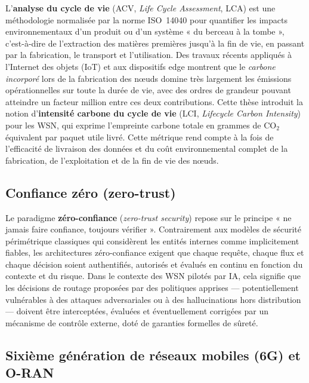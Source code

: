 L'\textbf{analyse du cycle de vie} (ACV, \emph{Life Cycle Assessment}, LCA) est une méthodologie normalisée par la norme ISO~14040 pour quantifier les impacts environnementaux d'un produit ou d'un système « du berceau à la tombe », c'est-à-dire de l'extraction des matières premières jusqu'à la fin de vie, en passant par la fabrication, le transport et l'utilisation\cite{iso14040}. Des travaux récents appliqués à l'Internet des objets (IoT) et aux dispositifs edge montrent que le \emph{carbone incorporé} lors de la fabrication des nœuds domine très largement les émissions opérationnelles sur toute la durée de vie, avec des ordres de grandeur pouvant atteindre un facteur million entre ces deux contributions\cite{pirson2021embodied,bashir2024sunk,mersy2025lca_data}. Cette thèse introduit la notion d'\textbf{intensité carbone du cycle de vie} (LCI, \emph{Lifecycle Carbon Intensity}) pour les WSN, qui exprime l'empreinte carbone totale en grammes de CO$_2$ équivalent par paquet utile livré. Cette métrique rend compte à la fois de l'efficacité de livraison des données et du coût environnemental complet de la fabrication, de l'exploitation et de la fin de vie des nœuds\cite{pirson2021embodied,aioti2024carbon}.

\subsection*{Confiance zéro (zero-trust)}

Le paradigme \textbf{zéro-confiance} (\emph{zero-trust security}) repose sur le principe « ne jamais faire confiance, toujours vérifier »\cite{rose2020nist}. Contrairement aux modèles de sécurité périmétrique classiques qui considèrent les entités internes comme implicitement fiables, les architectures zéro-confiance exigent que chaque requête, chaque flux et chaque décision soient authentifiés, autorisés et évalués en continu en fonction du contexte et du risque\cite{Kizza2013,ztaiot_acm2025}. Dans le contexte des WSN pilotés par IA, cela signifie que les décisions de routage proposées par des politiques apprises — potentiellement vulnérables à des attaques adversariales ou à des hallucinations hors distribution — doivent être interceptées, évaluées et éventuellement corrigées par un mécanisme de contrôle externe, doté de garanties formelles de sûreté\cite{amodei2016concrete,Huang2017AdvRL,subplay_marl2025}.

\subsection*{Sixième génération de réseaux mobiles (6G) et O-RAN}

